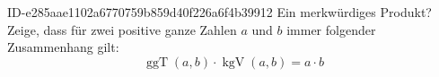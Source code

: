 \begin{exercise}
      {ID-e285aae1102a6770759b859d40f226a6f4b39912}
      {Ein merkwürdiges Produkt?}
  \ifproblem\problem
    Zeige, dass für zwei positive ganze Zahlen $a$ und $b$ immer
    folgender Zusammenhang gilt:
    \begin{equation*}
      \operatorname{ggT}(a,b)\cdot\operatorname{kgV}(a,b)
      =
      a\cdot b
    \end{equation*}
  \fi
\end{exercise}
